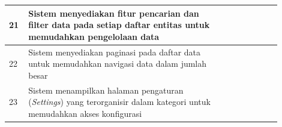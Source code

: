 \begin{longtable}{|p{0.05\linewidth}|p{0.65\linewidth}|p{0.1\linewidth}|p{0.1\linewidth}|}
      \hline
      21          & Sistem menyediakan fitur pencarian dan filter data pada setiap daftar entitas untuk memudahkan pengelolaan data                       &                                         &                \\
      \hline
      22          & Sistem menyediakan paginasi pada daftar data untuk memudahkan navigasi data dalam jumlah besar                                        &                                         &                \\
      \hline
      23          & Sistem menampilkan halaman pengaturan (\textit{Settings}) yang terorganisir dalam kategori untuk memudahkan akses konfigurasi         &                                         &                \\
      \hline
\end{longtable}


